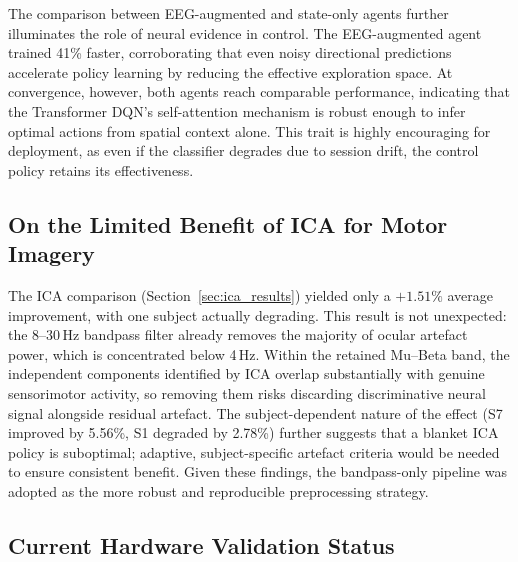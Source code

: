 \documentclass[12pt, a4paper]{article}
\begin{document}
The comparison between EEG-augmented and state-only agents further illuminates the role of neural evidence in control. The EEG-augmented agent trained 41\% faster, corroborating that even noisy directional predictions accelerate policy learning by reducing the effective exploration space. At convergence, however, both agents reach comparable performance, indicating that the Transformer DQN's self-attention mechanism is robust enough to infer optimal actions from spatial context alone. This trait is highly encouraging for deployment, as even if the classifier degrades due to session drift, the control policy retains its effectiveness.

\subsection{On the Limited Benefit of ICA for Motor Imagery}

The ICA comparison (Section~\ref{sec:ica_results}) yielded only a $+1.51\%$ average improvement, with one subject actually degrading. This result is not unexpected: the 8--30\,Hz bandpass filter already removes the majority of ocular artefact power, which is concentrated below 4\,Hz. Within the retained Mu--Beta band, the independent components identified by ICA overlap substantially with genuine sensorimotor activity, so removing them risks discarding discriminative neural signal alongside residual artefact. The subject-dependent nature of the effect (S7 improved by 5.56\%, S1 degraded by 2.78\%) further suggests that a blanket ICA policy is suboptimal; adaptive, subject-specific artefact criteria would be needed to ensure consistent benefit. Given these findings, the bandpass-only pipeline was adopted as the more robust and reproducible preprocessing strategy.

\subsection{Current Hardware Validation Status}
\end{document}
